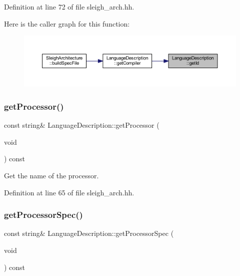 Definition at line 72 of file sleigh\+\_\+arch.\+hh.

Here is the caller graph for this function\+:
\nopagebreak
\begin{figure}[H]
\begin{center}
\leavevmode
\includegraphics[width=350pt]{class_language_description_a5e965680dedba272edd47113834f9f48_icgraph}
\end{center}
\end{figure}
\mbox{\label{class_language_description_ac503b8d360dc19de6e27bf3d887404a7}} 
\subsubsection{\texorpdfstring{getProcessor()}{getProcessor()}}
{\footnotesize\ttfamily const string\& Language\+Description\+::get\+Processor (\begin{DoxyParamCaption}\item[{void}]{ }\end{DoxyParamCaption}) const\hspace{0.3cm}{\ttfamily [inline]}}



Get the name of the processor. 



Definition at line 65 of file sleigh\+\_\+arch.\+hh.

\mbox{\label{class_language_description_aef9acf96d6dda8c01984cbfc6ab4f413}} 
\subsubsection{\texorpdfstring{getProcessorSpec()}{getProcessorSpec()}}
{\footnotesize\ttfamily const string\& Language\+Description\+::get\+Processor\+Spec (\begin{DoxyParamCaption}\item[{void}]{ }\end{DoxyParamCaption}) const\hspace{0.3cm}{\ttfamily [inline]}}



